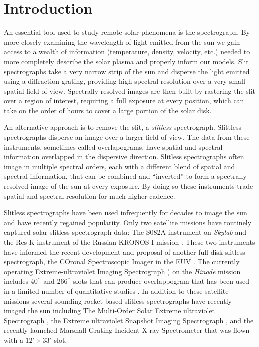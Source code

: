 
\section{Introduction}\label{sec:intro}
	
	An essential tool used to study remote solar phenomena is the spectrograph.
	By more closely examining the wavelength of light emitted from the sun we gain access to a wealth of information (temperature, density, velocity, etc.) needed to more completely describe the solar plasma and properly inform our models.
	Slit spectrographs take a very narrow strip of the sun and disperse the light emitted using a diffraction grating, providing high spectral resolution over a very small spatial field of view.
	Spectrally resolved images are then built by rastering the slit over a region of interest, requiring a full exposure at every position, which can take on the order of hours to cover a large portion of the solar disk.
	
	An alternative approach is to remove the slit, a \emph{slitless} spectrograph.
	Slittless spectrographs disperse an image over a larger field of view.
	The data from these instruments, sometimes called overlapograms, have spatial and spectral information overlapped in the dispersive direction.
	Slitless spectrographs often image in multiple spectral orders, each with a different blend of spatial and spectral information, that can be combined and ``inverted'' to form a spectrally resolved image of the sun at every exposure.
	By doing so these instruments trade spatial and spectral resolution for much higher cadence.
    
	Slitless spectrographs have been used infrequently for decades to image the sun and have recently regained popularity.
	Only two satellite missions have routinely captured solar slitless spectrograph data: The S082A instrument on {\it Skylab} \citep{Tousey1973} and the Res-K instrument of the Russian KRONOS-I mission \citep{Zhitnik1998}.
	These two instruments have informed the recent development and proposal of another 
	full disk slitless spectrograph, the COronal Spectroscopic Imager in the EUV  \citep[COSIE:][]{winebarger2019,golub2020}.
	The currently operating Extreme-ultraviolet Imaging Spectrograph \citep[EIS:][]{culhane2007}) on the {\it Hinode} mission \citep{kosugi2007} includes 40$^{\prime\prime}$ and 266$^{\prime\prime}$ slots that can produce overlappogram that has been used in a limited number of quantitative studies \citep{harra2017,harra2020}.
	In addition to these satellite missions several sounding rocket based slitless spectrographs have recently imaged the sun including The Multi-Order Solar Extreme ultraviolet Spectrograph \citep[MOSES:][]{Fox2011}, the Extreme ultraviolet Snapshot Imaging Spectrograph \citep[ESIS:][]{ESIS,Parker2021}, and the recently launched Marshall Grating Incident X-ray Spectrometer \citep[MaGIXS:][]{MaGIXS} that was flown with a $12' \times 33'$ slot.
	
